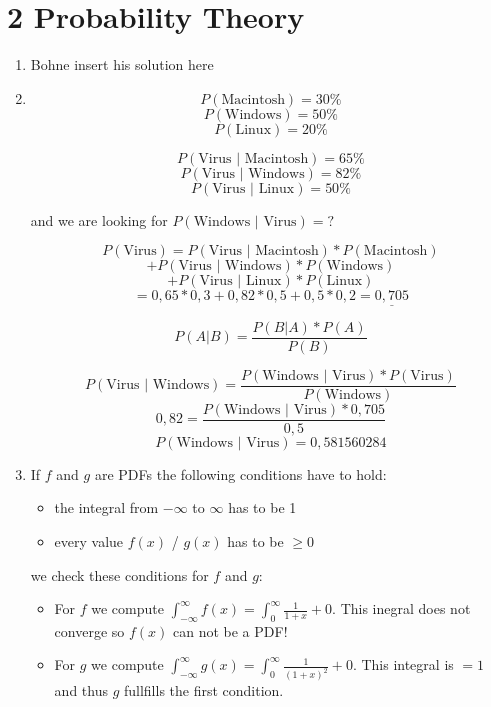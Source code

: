 \documentclass[12pt]{article}
\begin{document}
\section*{2 Probability Theory}
\begin{enumerate}[1)]
    \item 
        Bohne insert his solution here
        
    \item
        $$ P(\text{Macintosh}) = 30\% $$
        $$ P(\text{Windows})= 50\% $$
        $$ P(\text{Linux})= 20\% $$

        $$ P( \text{Virus } \vert \text{ Macintosh}) = 65\% $$
        $$ P( \text{Virus } \vert \text{ Windows}) = 82\% $$
        $$ P( \text{Virus } \vert \text{ Linux}) = 50\% $$

        and we are looking for $P(\text{Windows } \vert \text{ Virus}) = \text{?}$

        $$ P( \text{Virus}) = P( \text{Virus } \vert \text{ Macintosh}) * P( \text{Macintosh}) $$
        $$+ P( \text{Virus } \vert \text{ Windows}) * P( \text{Windows}) $$
        $$+ P( \text{Virus } \vert \text{ Linux}) * P( \text{Linux}) $$
        $$ = 0,65*0,3 + 0,82*0,5 + 0,5 * 0,2 = \underline{0,705} $$

        $$ P(A \vert B) = \frac{P(B \vert A) * P(A)}{P(B)} $$

        $$ P( \text{Virus } \vert \text{ Windows}) = \frac{ P( \text{Windows } \vert \text{ Virus}) * P( \text{Virus})}{P( \text{Windows})} $$
        $$ 0,82 = \frac{ P( \text{Windows } \vert \text{ Virus}) * 0,705}{0,5}$$
        $$ P( \text{Windows } \vert \text{ Virus}) = 0,581560284 $$

    \item
        If $f$ and $g$ are PDFs the following conditions have to hold:
        \begin{itemize}
            \item 
                the integral from $-\infty$ to $\infty$ has to be 1
            \item
                every value $f(x)$ / $g(x)$ has to be $\geq 0$
        \end{itemize}

        we check these conditions for $f$ and $g$:
        \begin{itemize}
            \item 
                For $f$ we compute $\int_{-\infty}^{\infty} f(x) = \int_{0}^{\infty} \frac{1}{1+x} + 0$. This inegral does not converge so $f(x)$ can not be a PDF!
            \item
                For $g$ we compute $\int_{-\infty}^{\infty} g(x) = \int_{0}^{\infty} \frac{1}{(1+x)^2} + 0$. This integral is $ = 1$ and thus $g$ fullfills the first condition.


\end{itemize}
\end{enumerate}
\end{document}
